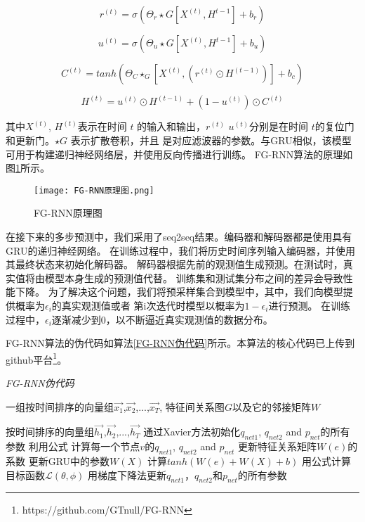 \begin{equation}
    r^{(t)} = \sigma(\Theta_r\star G[X^{(t)},H^{t-1}] + b_r)
\end{equation}

\begin{equation}
    u^{(t)} = \sigma(\Theta_u\star G[X^{(t)},H^{t-1}] + b_u)
\end{equation}

\begin{equation}
    C^{(t)} = tanh(\Theta_C\star_G[X^{(t)},(r^{(t)}\odot H^{(t-1)})] + b_c)
\end{equation}

\begin{equation}
    H^{(t)} = u^{(t)}\odot H^{(t-1)} + (1 - u^{(t)}) \odot C^{(t)}
\end{equation}

其中$X^{(t)}$, $H^{(t)}$表示在时间 $t$ 的输入和输出，$r^{(t)}$ $u^{(t)}$分别是在时间 $t$的复位门和更新门。$\star G$  表示扩散卷积，并且  是对应滤波器的参数。与GRU相似，该模型可用于构建递归神经网络层，并使用反向传播进行训练。
FG-RNN算法的原理如图\ref{fig:FG-RNN原理图}所示。
\begin{figure}[H]
  \centering
  \texttt{[image: FG-RNN原理图.png]}
  \caption{FG-RNN原理图}
  \label{fig:FG-RNN原理图}
\end{figure}

在接下来的多步预测中，我们采用了seq2seq结果\cite{sutskever2014sequence}。编码器和解码器都是使用具有GRU的递归神经网络。 在训练过程中，我们将历史时间序列输入编码器，并使用其最终状态来初始化解码器。 解码器根据先前的观测值生成预测。在测试时，真实值将由模型本身生成的预测值代替。 训练集和测试集分布之间的差异会导致性能下降。 为了解决这个问题，我们将预采样\cite{bengio2015scheduled}集合到模型中，其中，我们向模型提供概率为$\epsilon_i$的真实观测值或者 第i次迭代时模型以概率为$1-\epsilon_i$进行预测。 在训练过程中，$\epsilon_i$逐渐减少到0，以不断逼近真实观测值的数据分布。

FG-RNN算法的伪代码如算法\ref{FG-RNN伪代码}所示。本算法的核心代码已上传到github平台\footnote{https://github.com/GTnull/FG-RNN}。
\begin{algorithm}[!h]
  \caption{\emph{FG-RNN伪代码}}
  \label{FG-RNN伪代码}
  \begin{algorithmic}[1]
    \Require
      一组按时间排序的向量组$\vec{x_1}$,$\vec{x_2}$,...,$\vec{x_T}$, 特征间关系图$G$以及它的邻接矩阵$W$

    \Ensure
      按时间排序的向量组$\vec{h_1}$,$\vec{h_2}$,...,$\vec{h_T}$
    \State 通过Xavier方法初始化$q_{net1}$, $q_{net2}$ and $p_{net}$的所有参数
        \State 利用公式 计算每一个节点$v$的$q_{net1}$, $q_{net2}$ and $p_{net}$
        \State 更新特征关系矩阵$W(e)$的系数
        \State 更新GRU中的参数$W(X)$
        \State 计算$tanh(W(e) + W(X) + b)$        
        \EndFor
        \State 用公式计算目标函数$\mathcal{L}(\theta, \phi)$ 
        \State 用梯度下降法更新$q_{net1}$，$q_{net2}$和$p_{net}$的所有参数
    \EndWhile
  \end{algorithmic}
\end{algorithm}

